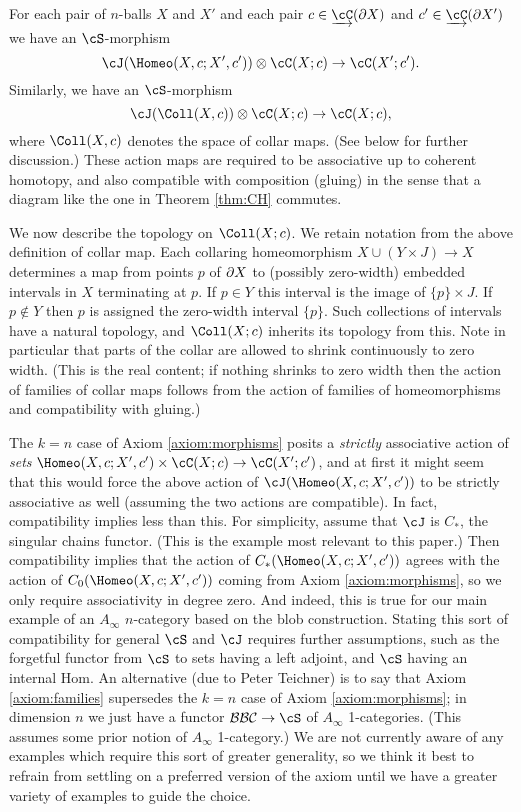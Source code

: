 \begin{axiom}
\label{axiom:families}
For each pair of $n$-balls $X$ and $X'$ and each pair $c\in \cl{\cC}(\bd X)$ and $c'\in \cl{\cC}(\bd X')$ we have an $\cS$-morphism
\[
	\cJ(\Homeo(X,c; X', c')) \ot \cC(X; c) \to \cC(X'; c') .
\]
Similarly, we have an $\cS$-morphism
\[
	\cJ(\Coll(X,c)) \ot \cC(X; c) \to \cC(X; c),
\]
where $\Coll(X,c)$ denotes the space of collar maps.
(See below for further discussion.)
These action maps are required to be associative up to coherent homotopy,
and also compatible with composition (gluing) in the sense that
a diagram like the one in Theorem \ref{thm:CH} commutes.
\end{axiom}

We now describe the topology on $\Coll(X; c)$.
We retain notation from the above definition of collar map.
Each collaring homeomorphism $X \cup (Y\times J) \to X$ determines a map from points $p$ of $\partial X$ to
(possibly zero-width) embedded intervals in $X$ terminating at $p$.
If $p \in Y$ this interval is the image of $\{p\}\times J$.
If $p \notin Y$ then $p$ is assigned the zero-width interval $\{p\}$.
Such collections of intervals have a natural topology, and $\Coll(X; c)$ inherits its topology from this.
Note in particular that parts of the collar are allowed to shrink continuously to zero width.
(This is the real content; if nothing shrinks to zero width then the action of families of collar
maps follows from the action of families of homeomorphisms and compatibility with gluing.)

The $k=n$ case of Axiom \ref{axiom:morphisms} posits a {\it strictly} associative action of {\it sets}
$\Homeo(X,c; X', c') \times \cC(X; c) \to \cC(X'; c')$, and at first it might seem that this would force the above
action of $\cJ(\Homeo(X,c; X', c'))$ to be strictly associative as well (assuming the two actions are compatible).
In fact, compatibility implies less than this.
For simplicity, assume that $\cJ$ is $C_*$, the singular chains functor.
(This is the example most relevant to this paper.)
Then compatibility implies that the action of $C_*(\Homeo(X,c; X', c'))$ agrees with the action
of $C_0(\Homeo(X,c; X', c'))$ coming from Axiom \ref{axiom:morphisms}, so we only require associativity in degree zero.
And indeed, this is true for our main example of an $A_\infty$ $n$-category based on the blob construction.
Stating this sort of compatibility for general $\cS$ and $\cJ$ requires further assumptions, 
such as the forgetful functor from $\cS$ to sets having a left adjoint, and $\cS$ having an internal Hom.
An alternative (due to Peter Teichner) is to say that Axiom \ref{axiom:families} 
supersedes the $k=n$ case of Axiom \ref{axiom:morphisms}; in dimension $n$ we just have a
functor $\bbc \to \cS$ of $A_\infty$ 1-categories.
(This assumes some prior notion of $A_\infty$ 1-category.)
We are not currently aware of any examples which require this sort of greater generality, so we think it best
to refrain from settling on a preferred version of the axiom until
we have a greater variety of examples to guide the choice.

